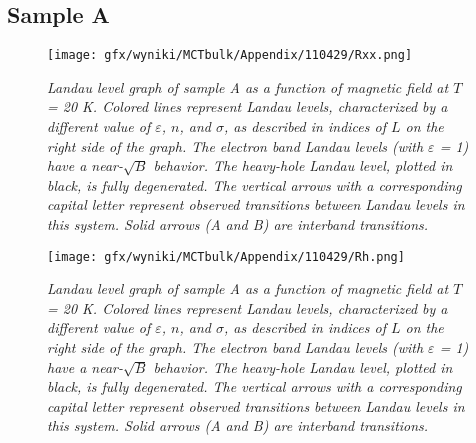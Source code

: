 \documentclass[titlepage,a4paper]{book}
\begin{document}
\subsection{Sample A}
\begin{figure}[ht]
	\centering
	\texttt{[image: gfx/wyniki/MCTbulk/Appendix/110429/Rxx.png]}
	\vspace{-10pt}
	\caption{\textit{Landau level graph of sample A as a function of magnetic field at $T$ = 20 K. Colored lines represent Landau levels, characterized by a different value of $\varepsilon$, $n$, and $\sigma$, as described in indices of $L$ on the right side of the graph. The electron band Landau levels (with $\varepsilon$ = 1) have a near-$\sqrt{B}$ behavior. The heavy-hole Landau level, plotted in black, is fully degenerated. The vertical arrows with a corresponding capital letter represent observed transitions between Landau levels in this system. Solid arrows (A and B) are interband transitions.}}
	\label{fig:110429_Rxx}
\end{figure}
\begin{figure}[ht]
	\centering
	\texttt{[image: gfx/wyniki/MCTbulk/Appendix/110429/Rh.png]}
	\vspace{-10pt}
	\caption{\textit{Landau level graph of sample A as a function of magnetic field at $T$ = 20 K. Colored lines represent Landau levels, characterized by a different value of $\varepsilon$, $n$, and $\sigma$, as described in indices of $L$ on the right side of the graph. The electron band Landau levels (with $\varepsilon$ = 1) have a near-$\sqrt{B}$ behavior. The heavy-hole Landau level, plotted in black, is fully degenerated. The vertical arrows with a corresponding capital letter represent observed transitions between Landau levels in this system. Solid arrows (A and B) are interband transitions.}}
	\label{fig:110429_Rh}
\end{figure}
\end{document}
